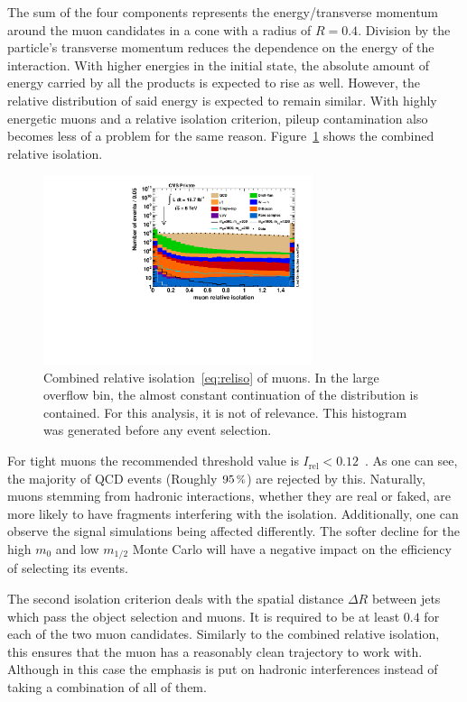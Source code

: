 The sum of the four components represents the energy/transverse momentum around the muon candidates in a cone with a radius of $R = 0.4$. Division by the particle's transverse momentum reduces the dependence on the energy of the interaction. With higher energies in the initial state, the absolute amount of energy carried by all the products is expected to rise as well. However, the relative distribution of said energy is expected to remain similar. With highly energetic muons and a relative isolation criterion, pileup contamination also becomes less of a problem for the same reason. Figure~\ref{fig:reliso} shows the combined relative isolation.

\begin{figure}[ht!]
  \centering
    \includegraphics[width=0.7\textwidth]{plots/reliso.pdf}
  \caption{Combined relative isolation~\ref{eq:reliso} of muons. In the large overflow bin, the almost constant continuation of the distribution is contained. For this analysis, it is not of relevance. This histogram was generated before any event selection.}
  \label{fig:reliso}
\end{figure}

\noindent For tight muons the recommended threshold value is $I_{\text{rel}} < 0.12$~\cite{muonpog}. As one can see, the majority of QCD events (Roughly $95\,\pct$) are rejected by this. Naturally, muons stemming from hadronic interactions, whether they are real or faked, are more likely to have fragments interfering with the isolation. Additionally, one can observe the signal simulations being affected differently. The softer decline for the high $m_0$ and low $m_{1/2}$ Monte Carlo will have a negative impact on the efficiency of selecting its events.

The second isolation criterion deals with the spatial distance $\Delta R$ between jets which pass the object selection and muons. It is required to be at least $0.4$ for each of the two muon candidates. Similarly to the combined relative isolation, this ensures that the muon has a reasonably clean trajectory to work with. Although in this case the emphasis is put on hadronic interferences instead of taking a combination of all of them.


